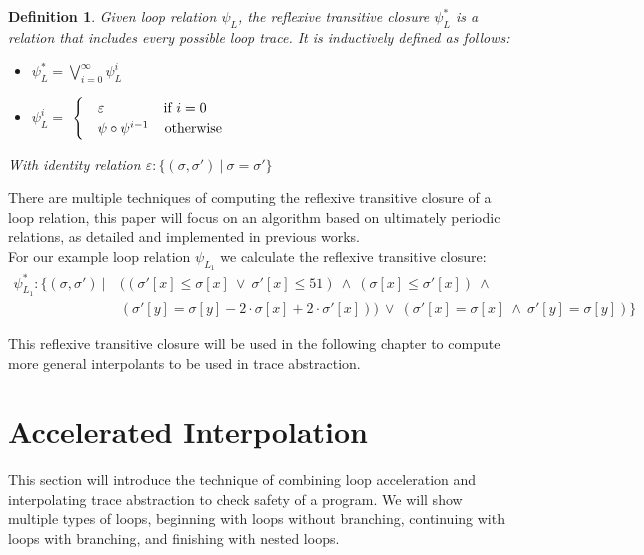 \documentclass{article}
\newcounter{example}[section]
\newtheorem{mydef}{Definition}
\begin{document}
\begin{mydef}
    Given loop relation $\psi_L$, the reflexive transitive closure $\psi_L^*$ is a relation that includes every possible loop trace. It is inductively defined as follows:
    \begin{itemize}
        \item $\psi^*_L = \bigvee_{i=0}^\infty \psi^i_L$
        \item $\psi^i_L = $
        $\begin{cases}
            & \varepsilon \hspace{1.5cm} \text{if}\ i = 0 \\
            & \psi \circ \psi^{i - 1} \hspace{0.4cm}\text{otherwise}
        \end{cases}$
    \end{itemize}
With identity relation $\varepsilon: \{(\sigma, \sigma')\ |\ \sigma = \sigma'\}$
\end{mydef}
There are multiple techniques of computing the reflexive transitive closure of a loop relation, this paper will focus on an algorithm based on ultimately periodic relations, as detailed and implemented in previous works\cite{JillThesis}. \\

For our example loop relation  	$\psi_{L_1}$ we calculate the reflexive transitive closure:
\begin{align*}
    \psi^*_{L_1}: \{(\sigma, \sigma') \  |\ &((\sigma'[x] \leq \sigma[x]\ \lor\ \sigma'[x] \leq 51)\ \land\ (\sigma[x] \leq \sigma'[x])\ \land\ \\ & (\sigma'[y] = \sigma[y] - 2 \cdot \sigma[x] + 2\cdot \sigma'[x]))\ \lor\ (\sigma'[x] = \sigma[x]\ \land\ \sigma'[y] = \sigma[y]) \}
\end{align*}

This reflexive transitive closure will be used in the following chapter to compute more general interpolants to be used in trace abstraction.

\section{Accelerated Interpolation}
This section will introduce the technique of combining loop acceleration and interpolating trace abstraction to check safety of a program. We will show multiple types of loops, beginning with loops without branching, continuing with loops with branching, and finishing with nested loops. \\
\end{document}
